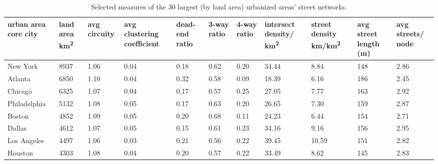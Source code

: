 \documentclass[Afour,sageh,times]{sagej}
\begin{document}
\begin{landscape}
\begin{table}
\centering
\caption{Selected measures of the 30 largest (by land area) urbanized areas' street networks.}
\label{tab:largest_urbanized_areas}
\begin{tabular}{p{2.5cm} p{1.5cm} p{1.5cm} p{1.5cm} p{1.55cm} p{1.5cm} p{1.5cm} p{1.5cm} p{1.5cm} p{1.5cm} p{1.5cm}}
\hline
urban area core city & land area km\textsuperscript{2} & avg circuity & avg clustering coefficient & dead-end ratio & 3-way ratio & 4-way ratio & intersect density/ km\textsuperscript{2} & street density km/km\textsuperscript{2} & avg street length (m) & avg streets/ node \\
\hline
New York             & 8937          & 1.06         & 0.04                       & 0.18           & 0.62        & 0.20        & 34.44                 & 8.84                  & 148                   & 2.86             \\
Atlanta              & 6850          & 1.10         & 0.04                       & 0.32           & 0.58        & 0.09        & 18.39                 & 6.16                  & 186                   & 2.45             \\
Chicago              & 6325          & 1.07         & 0.04                       & 0.17           & 0.57        & 0.25        & 27.05                 & 7.77                  & 163                   & 2.92             \\
Philadelphia         & 5132          & 1.08         & 0.05                       & 0.17           & 0.63        & 0.20        & 26.65                 & 7.30                  & 159                   & 2.87             \\
Boston               & 4852          & 1.09         & 0.05                       & 0.20           & 0.68        & 0.11        & 24.23                 & 6.44                  & 154                   & 2.71             \\
Dallas               & 4612          & 1.07         & 0.05                       & 0.15           & 0.61        & 0.23        & 34.16                 & 9.16                  & 156                   & 2.95             \\
Los Angeles          & 4497          & 1.06         & 0.03                       & 0.21           & 0.56        & 0.22        & 39.45                 & 10.59                 & 151                   & 2.82             \\
Houston              & 4303          & 1.08         & 0.04                       & 0.20           & 0.57        & 0.22        & 33.49                 & 8.62                  & 145                   & 2.83             \\

\end{tabular}
\end{table}
\end{landscape}
\end{document}
